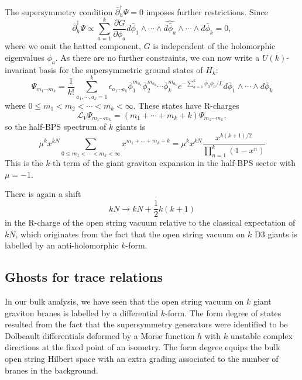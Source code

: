 \documentclass[a4paper,12pt]{article}
\begin{document}
The supersymmetry condition $\bar\partial_h^\dag \Psi = 0$ imposes further restrictions. Since
\begin{equation}
\bar\partial_h^\dag \Psi \propto \sum_{a=1}^k \frac{\partial G}{\partial \phi_a} d\bar\phi_1 \wedge \cdots \wedge \widehat{d\bar\phi_a} \wedge \cdots \wedge d\bar\phi_k =0,
\end{equation}
where we omit the hatted component, $G$ is independent of the holomorphic eigenvalues $\phi_a$. As there are no further constraints, we can now write a $U(k)$-invariant basis for the supersymmetric ground states of $H_k$:
\begin{equation}
\Psi_{m_1 \cdots m_k} = \frac{1}{k!} \sum_{a_1,\cdots, a_k=1}^k \epsilon_{a_1 \cdots a_k} \bar\phi_1^{m_{a_1}} \bar\phi_2^{m_{a_2}} \cdots \bar\phi_k^{m_{a_k}}  e^{-\sum_{a=1}^k \bar{\phi}_a \phi_a  / L} d\bar\phi_1 \wedge \cdots \wedge d\bar\phi_k
\end{equation}
where $0 \leq m_1<m_2< \cdots<m_k<\infty$. These states have R-charges
\begin{equation}
\mathcal{L}_V \Psi_{m_1 \cdots m_k} = (m_1 + \cdots + m_k + k) \Psi_{m_1 \cdots m_k},
\end{equation}
so the half-BPS spectrum of $k$ giants is
\begin{equation} \label{eq:k giant spectrum}
\mu^k x^{k N} \sum_{0 \leq m_1<\cdots<m_k<\infty} x^{m_1 + \cdots + m_k + k} = \mu^k x^{k N} \frac{x^{k(k+1)/2}}{\prod_{n=1}^k (1-x^n)}
\end{equation}
This is the $k$-th term of the giant graviton expansion in the half-BPS sector with $\mu = -1$.

There is again a shift
\begin{equation}
k N \to k N + \frac{1}{2} k(k+1)
\end{equation}
in the R-charge of the open string vacuum relative to the classical expectation of $k N$, which originates from the fact that the open string vacuum on $k$ D3 giants is labelled by an anti-holomorphic $k$-form.


\subsection{Ghosts for trace relations} \label{subsec:ghostsfortracerelations}

In our bulk analysis, we have seen that the open string vacuum on $k$ giant graviton branes is labelled by a differential $k$-form. The form degree of states resulted from the fact that the supersymmetry generators were identified to be Dolbeault differentials deformed by a Morse function $h$ with $k$ unstable complex directions at the fixed point of an isometry. The form degree equips the bulk open string Hilbert space with an extra grading associated to the number of branes in the background.
\end{document}
